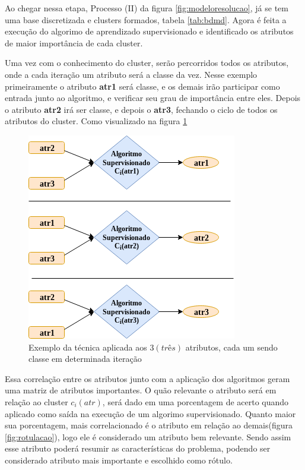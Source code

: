 Ao chegar nessa etapa, Processo (II) da figura \ref{fig:modeloresolucao}, já se tem uma base discretizada e clusters formados, tabela \ref{tab:bdmd}. Agora é feita a execução do algorimo de aprendizado supervisionado e identificado os atributos de maior importância de cada cluster.

Uma vez com o conhecimento do cluster, serão percorridos todos os atributos, onde a cada iteração um atributo será a classe da vez. Nesse exemplo primeiramente o atributo \textbf{atr1} será classe, e os demais irão participar como entrada junto ao algoritmo, e verificar seu grau de importância entre eles. Depois o atributo \textbf{atr2} irá ser classe, e depois o \textbf{atr3}, fechando o ciclo de todos os atributos do cluster. Como visualizado na figura \ref{fig:tecnicamodelocomp} 
\begin{figure}[h!]
        \centering
        \includegraphics[scale=0.7]{figs/tecnicamodeloComp.png}
        \caption{Exemplo da técnica aplicada aos ${3 (três)}$ atributos, cada um sendo classe em determinada iteração } \label{fig:tecnicamodelocomp}
\end{figure}

Essa correlação entre os atributos junto com a aplicação dos algoritmos geram uma matriz de atributos importantes. O quão relevante o atributo será em relação ao cluster ${c_i(atr)}$, será dado em uma porcentagem de acerto quando aplicado como saída na execução de um algorimo supervisionado. Quanto maior sua porcentagem, mais correlacionado é o atributo em relação ao demais(figura \ref{fig:rotulacao}), logo ele é considerado um atributo bem relevante. Sendo assim esse atributo poderá resumir as características do problema, podendo ser considerado atributo mais importante e escolhido como rótulo.

